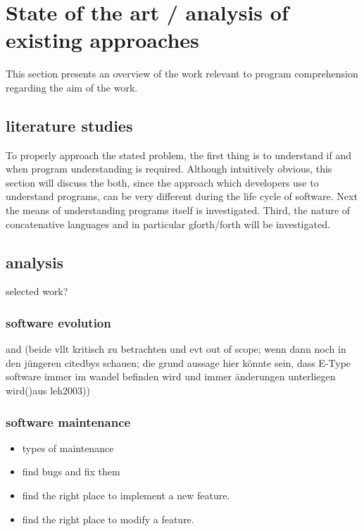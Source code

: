 \chapter{State of the art / analysis of existing approaches}

This section presents an overview of the work relevant to program comprehension regarding the aim of the work.

\section{literature studies}

To properly approach the stated problem, the first thing is to understand if and when program understanding is required. Although intuitively obvious, this section will discuss the both, since the approach which developers use to understand programs, can be very different during the life cycle of software. Next the means of understanding programs itself is investigated. Third, the nature of concatenative languages and in particular gforth/forth will be investigated.

\section{analysis}

selected work?

\subsection{software evolution}

\cite{Lehman:1985:PEP:7261} and \cite{Lehman:2003:SEB:950401.950407} (beide vllt kritisch zu betrachten und evt out of scope; wenn dann noch in den jüngeren citedbys schauen; die grund aussage hier könnte sein, dass E-Type software immer im wandel befinden wird und immer änderungen unterliegen wird()aus leh2003))

\subsection{software maintenance}

\begin{itemize}
\item types of maintenance
\item find bugs and fix them
\item find the right place to implement a new feature.
\item find the right place to modify a feature.
\end{itemize}

